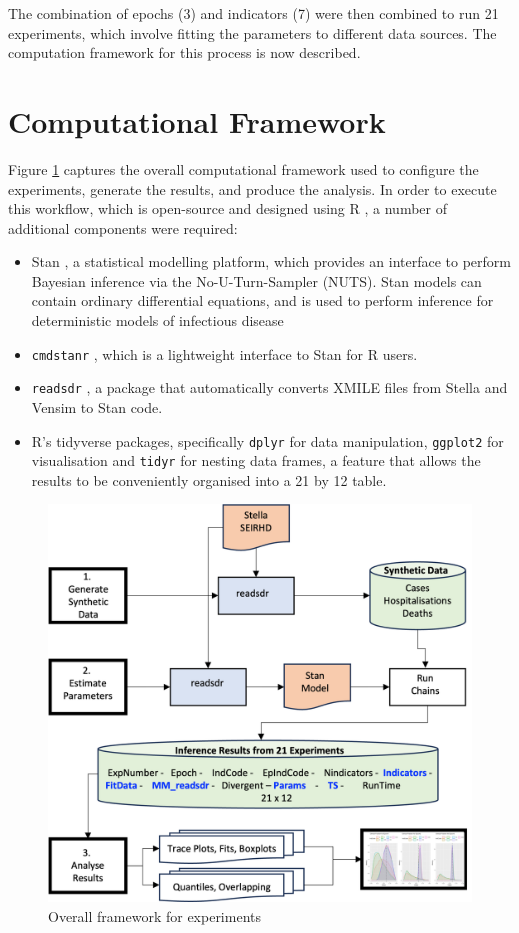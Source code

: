 \documentclass[10pt,letterpaper]{article}
\begin{document}
The combination of epochs (3) and indicators (7) were then combined to run 21 experiments, which involve fitting the parameters to different data sources. The computation framework for this process is now described.

\hypertarget{computational-framework}{%
\section{Computational Framework}\label{computational-framework}}

Figure \ref{fig:sys-design} captures the overall computational framework used to configure the experiments, generate the results, and produce the analysis. In order to execute this workflow, which is open-source and designed using R \citep{duggan2016system, ExploreR}, a number of additional components were required:

\begin{itemize}
\item
  Stan \citep{carpenter2017stan}, a statistical modelling platform, which provides an interface to perform Bayesian inference via the No-U-Turn-Sampler (NUTS). Stan models can contain ordinary differential equations, and is used to perform inference for deterministic models of infectious disease \citep{https://doi.org/10.1002/sdr.1693, ANDRADE2020100415, doi:10.1098/rsos.230515}
\item
  \texttt{cmdstanr} \citep{gabry2021cmdstanr}, which is a lightweight interface to Stan for R users.
\item
  \texttt{readsdr} \citep{andrade_readsdr}, a package that automatically converts XMILE ﬁles from Stella and Vensim to Stan code.
\item
  R's tidyverse packages, specifically \texttt{dplyr} for data manipulation, \texttt{ggplot2} for visualisation and \texttt{tidyr} for nesting data frames, a feature that allows the results to be conveniently organised into a 21 by 12 table.
\end{itemize}

\begin{figure}
\includegraphics[width=0.85\linewidth]{diagrams/sys_design} \caption{Overall framework for experiments}\label{fig:sys-design}
\end{figure}
\end{document}
